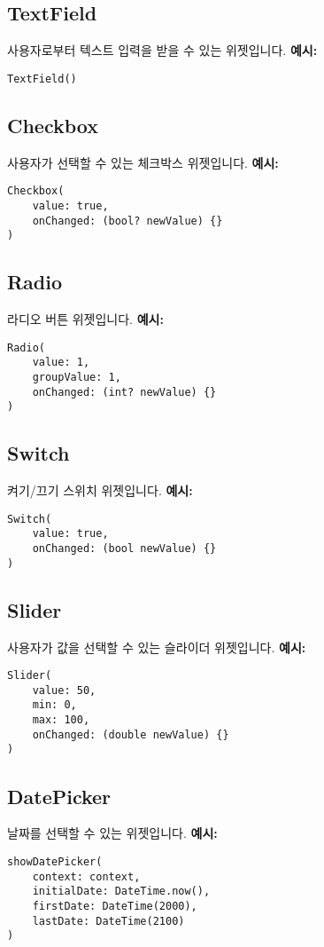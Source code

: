\documentclass{article}
\begin{document}
\subsection*{TextField}
사용자로부터 텍스트 입력을 받을 수 있는 위젯입니다.
\textbf{예시:}
\begin{lstlisting}
TextField()
\end{lstlisting}

\subsection*{Checkbox}
사용자가 선택할 수 있는 체크박스 위젯입니다.
\textbf{예시:}
\begin{lstlisting}
Checkbox(
    value: true,
    onChanged: (bool? newValue) {}
)
\end{lstlisting}

\subsection*{Radio}
라디오 버튼 위젯입니다.
\textbf{예시:}
\begin{lstlisting}
Radio(
    value: 1,
    groupValue: 1,
    onChanged: (int? newValue) {}
)
\end{lstlisting}

\subsection*{Switch}
켜기/끄기 스위치 위젯입니다.
\textbf{예시:}
\begin{lstlisting}
Switch(
    value: true,
    onChanged: (bool newValue) {}
)
\end{lstlisting}

\subsection*{Slider}
사용자가 값을 선택할 수 있는 슬라이더 위젯입니다.
\textbf{예시:}
\begin{lstlisting}
Slider(
    value: 50,
    min: 0,
    max: 100,
    onChanged: (double newValue) {}
)
\end{lstlisting}

\subsection*{DatePicker}
날짜를 선택할 수 있는 위젯입니다.
\textbf{예시:}
\begin{lstlisting}
showDatePicker(
    context: context,
    initialDate: DateTime.now(),
    firstDate: DateTime(2000),
    lastDate: DateTime(2100)
)
\end{lstlisting}
\end{document}
